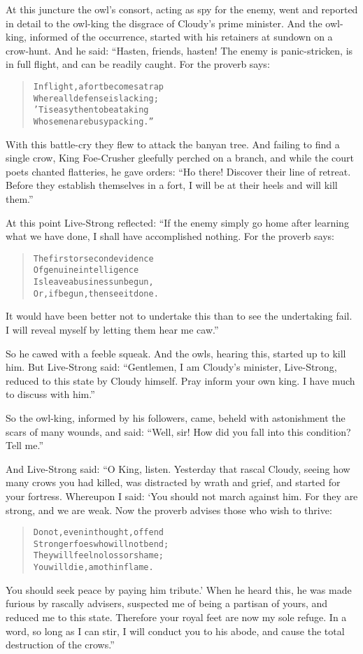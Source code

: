 \documentclass[article, twoside, 14pt]{memoir}
\renewenvironment{verbatim}{%
\begin{quote}%
\vskip -10pt%
\begin{alltt}\normalfont\large}{\end{alltt}%
\end{quote}%
\vskip -10pt
} %
\begin{document}
At this juncture the owl's consort, acting as spy for the enemy,
went and reported in detail to the owl-king the disgrace of
Cloudy's prime minister. And the owl-king, informed of the
occurrence, started with his retainers at sundown on a crow-hunt.
And he said: “Hasten, friends, hasten! The enemy is panic-stricken,
is in full flight, and can be readily caught. For the proverb
says:

\begin{verbatim}
In flight, a fort becomes a trap
    Where all defense is lacking;
'Tis easy then to beat a king
    Whose men are busy packing.”
\end{verbatim}
With this battle-cry they flew to attack the banyan tree. And
failing to find a single crow, King Foe-Crusher gleefully perched
on a branch, and while the court poets chanted flatteries, he gave
orders:
``Ho there! Discover their line of retreat. Before they establish themselves in a fort, I will be at their heels and will kill them.''

At this point Live-Strong reflected: “If the enemy simply go home
after learning what we have done, I shall have accomplished
nothing. For the proverb says:

\begin{verbatim}
The first or second evidence
Of genuine intelligence
Is{\textemdash}leave a business unbegun,
Or, if begun, then see it done.
\end{verbatim}
It would have been better not to undertake this than to see the
undertaking fail. I will reveal myself by letting them hear me
caw.”

So he cawed with a feeble squeak. And the owls, hearing this,
started up to kill him. But Live-Strong said:
``Gentlemen, I am Cloudy's minister, Live-Strong, reduced to this state by Cloudy himself. Pray inform your own king. I have much to discuss with him.''

So the owl-king, informed by his followers, came, beheld with
astonishment the scars of many wounds, and said:
``Well, sir! How did you fall into this condition? Tell me.''

And Live-Strong said: “O King, listen. Yesterday that rascal
Cloudy, seeing how many crows you had killed, was distracted by
wrath and grief, and started for your fortress. Whereupon I said:
‘You should not march against him. For they are strong, and we are
weak. Now the proverb advises those who wish to thrive:

\begin{verbatim}
Do not, even in thought, offend
Stronger foes who will not bend;
They will feel no loss or shame;
You will die, a moth in flame.
\end{verbatim}
You should seek peace by paying him tribute.' When he heard this,
he was made furious by rascally advisers, suspected me of being a
partisan of yours, and reduced me to this state. Therefore your
royal feet are now my sole refuge. In a word, so long as I can
stir, I will conduct you to his abode, and cause the total
destruction of the crows.”
\end{document}
